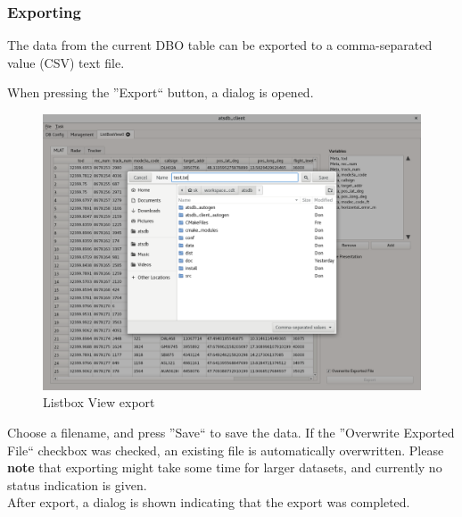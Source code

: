 \subsubsection{Exporting}

The data from the current DBO table can be exported to a comma-separated value (CSV) text file. 

When pressing the ''Export`` button, a dialog is opened.

\begin{figure}[H]
    \hspace*{-2cm}
    \includegraphics[width=18cm,frame]{../screenshots/listbox_export.png}
  \caption{Listbox View export}
  \label{fig:listbox_export}
\end{figure}

Choose a filename, and press ''Save`` to save the data. If the ''Overwrite Exported File`` checkbox was checked, an existing file is automatically overwritten. Please \textbf{note} that exporting might take some time for larger datasets, and currently no status indication is given.\\
After export, a dialog is shown indicating that the export was completed.

